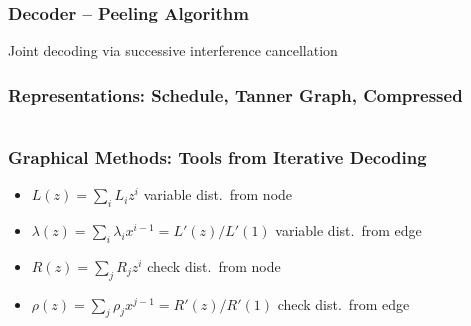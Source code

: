 \documentclass[10pt]{beamer}
\begin{document}
\begin{frame}
\frametitle{Decoder -- Peeling Algorithm}
Joint decoding via successive interference cancellation
  \begin{center}
  \scalebox{1}{}
  \end{center}
\end{frame}


\begin{frame}
\frametitle{Representations: Schedule, Tanner Graph, Compressed}
\begin{center}
  \scalebox{1}{}
\end{center}
\begin{columns}
  \begin{center}
  \scalebox{0.8}{}
  \end{center}
  \begin{center}
  \scalebox{0.8}{}
  \end{center}
\end{columns}
\end{frame}


\begin{frame}
\frametitle{Graphical Methods: Tools from Iterative Decoding}
\begin{itemize}
\item $L(z) = \sum_i L_i z^i$ variable dist.\ from node
\item $\lambda(z) = \sum_i \lambda_i x^{i-1} = {L'(z)}/{L'(1)}$ variable dist.\ from edge
\item $R(z) = \sum_j R_j z^i$ check dist.\ from node
\item $\rho(z) = \sum_j \rho_j x^{j-1} = {R'(z)}/{R'(1)}$ check dist.\ from edge
\end{itemize}
\begin{columns}
  \begin{center}
  \scalebox{0.8}{}
  \end{center}
  \begin{center}
  \scalebox{0.7}{}
  \end{center}
\end{columns}
\end{frame}
\end{document}
